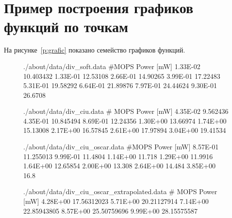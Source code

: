 \section{Пример построения графиков функций по точкам}

На рисунке~\ref{p:grafic} показано семейство графиков функций.

\begin{figure}[!h]\center
  \captionsetup{singlelinecheck=true} %


\begin{filecontents}{./about/data/div_soft.data}
#MOPS 	Power [mW]
1.33E-02	10.403432
1.33E-01	12.53108
2.66E-01	14.90265
3.99E-01	17.22483
5.31E-01	19.58292
6.64E-01	21.89876
7.97E-01	24.44624
9.30E-01	26.6708
\end{filecontents}

\begin{filecontents}{./about/data/div_ciu.data}
# MOPS 	Power [mW]
4.35E-02	9.562436
4.35E-01	10.845494
8.69E-01	12.24356
1.30E+00	13.66974
1.74E+00	15.13008
2.17E+00	16.57845
2.61E+00	17.97894
3.04E+00	19.41534
\end{filecontents}

\begin{filecontents}{./about/data/div_ciu_oscar.data}
#MOPS 	Power [mW]
8.57E-01	11.255013
9.99E-01	11.4804
1.14E+00	11.718
1.29E+00	11.9916
1.64E+00	12.65854
2.00E+00	13.308
2.64E+00	14.484
3.85E+00	16.8
\end{filecontents}

\begin{filecontents}{./about/data/div_ciu_oscar_extrapolated.data}
# MOPS 	Power [mW]
4.28E+00	17.56312023
5.71E+00	20.21127914
7.14E+00	22.85943805
8.57E+00	25.50759696
9.99E+00	28.15575587
\end{filecontents}


\end{figure}

